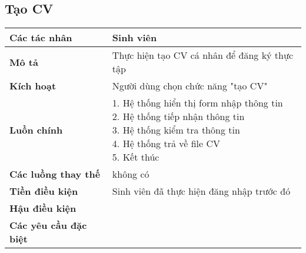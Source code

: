 \subsection{Tạo CV}
\begin{tabular}{|l|l|}
	\hline
	\textbf{Các tác nhân}         & Sinh viên                                             \\
	\hline
	\textbf{Mô tả}                & Thực hiện tạo CV cá nhân để đăng ký thực tập          \\
	\hline
	\textbf{Kích hoạt}            & Người dùng chọn chức năng "tạo CV"                    \\
	\hline
	\textbf{Luồn chính}           & \makecell[l]{1. Hệ thống hiển thị form nhập thông tin \\ 2. Hệ thống tiếp nhận thông tin \\ 3. Hệ thống kiểm tra thông tin \\ 4. Hệ thống trả về file CV \\ 5. Kết thúc} \\
	\hline
	\textbf{Các luồng thay thế}   & không có                                              \\
	\hline
	\textbf{Tiền điều kiện}       & Sinh viên đã thực hiện đăng nhập trước đó             \\
	\hline
	\textbf{Hậu điều kiện}        &                                                       \\
	\hline
	\textbf{Các yêu cầu đặc biệt} &                                                       \\
	\hline
\end{tabular}

